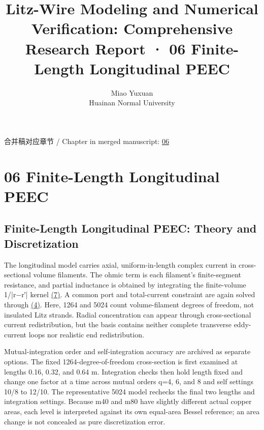 \documentclass[11pt]{article}
\begin{document}
\title{Litz-Wire Modeling and Numerical Verification: Comprehensive Research Report · 06 Finite-Length Longitudinal PEEC}
\author{Miao Yuxuan\\Huainan Normal University}
\date{}
\maketitle
\noindent 合并稿对应章节 / Chapter in merged manuscript: \href{report_en_single.pdf#chapter-06}{06}\par
\FloatBarrier
\section*{06 Finite-Length Longitudinal PEEC}
\hypertarget{chapter-06}{}
\subsection*{Finite-Length Longitudinal PEEC: Theory and Discretization}
\hypertarget{06.peec_method.heading}{}
The longitudinal model carries axial, uniform-in-length complex current in cross-sectional volume filaments. The ohmic term is each filament’s finite-segment resistance, and partial inductance is obtained by integrating the finite-volume 1/|r−r′| kernel \href{report_en_single.pdf#E08}{(7)}. A common port and total-current constraint are again solved through \href{report_en_single.pdf#E04}{(4)}. Here, 1264 and 5024 count volume-filament degrees of freedom, not insulated Litz strands. Radial concentration can appear through cross-sectional current redistribution, but the basis contains neither complete transverse eddy-current loops nor realistic end redistribution.


Mutual-integration order and self-integration accuracy are archived as separate options. The fixed 1264-degree-of-freedom cross-section is first examined at lengths 0.16, 0.32, and 0.64 m. Integration checks then hold length fixed and change one factor at a time across mutual orders q=4, 6, and 8 and self settings 10/8 to 12/10. The representative 5024 model rechecks the final two lengths and integration settings. Because m40 and m80 have slightly different actual copper areas, each level is interpreted against its own equal-area Bessel reference; an area change is not concealed as pure discretization error.
\end{document}
